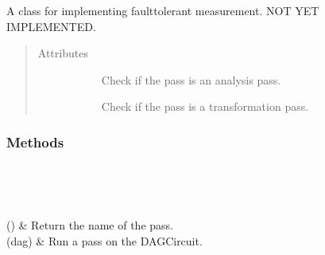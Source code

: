 \documentclass[letterpaper,10pt,english]{sphinxmanual}
\begin{document}
\begin{fulllineitems}
\label{\detokenize{Base:BaseFaultTolerance.BaseFaultTolerantMeasurement}}
\sphinxAtStartPar
A class for implementing fault\sphinxhyphen{}tolerant measurement. NOT YET IMPLEMENTED.
\begin{quote}\begin{description}
\item[{Attributes}] \leavevmode\begin{description}
\item[{}] \leavevmode
\sphinxAtStartPar
Check if the pass is an analysis pass.

\item[{}] \leavevmode
\sphinxAtStartPar
Check if the pass is a transformation pass.

\end{description}

\end{description}\end{quote}
\subsubsection*{Methods}


\begin{savenotes}\sphinxatlongtablestart\begin{longtable}[c]{}
\hline

\endfirsthead

%
{}\\
\hline

\endhead

\hline
{}\\
\endfoot

\endlastfoot

\sphinxAtStartPar
{}()
&
\sphinxAtStartPar
Return the name of the pass.
\\
\hline
\sphinxAtStartPar
{}(dag)
&
\sphinxAtStartPar
Run a pass on the DAGCircuit.
\\
\hline
\end{longtable}\sphinxatlongtableend\end{savenotes}

\end{fulllineitems}
\end{document}
